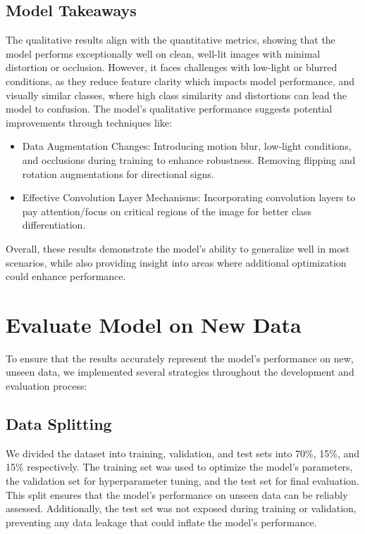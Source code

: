 \documentclass{article} %
\begin{document}
\subsection{Model Takeaways}

The qualitative results align with the quantitative metrics, showing that the model performs exceptionally well on clean, well-lit images with minimal distortion or occlusion. However, it faces challenges with low-light or blurred conditions, as they reduce feature clarity which impacts model performance, and visually similar classes, where high class similarity and distortions can lead the model to confusion. The model’s qualitative performance suggests potential improvements through techniques like:
\begin{itemize}
    \item Data Augmentation Changes: Introducing motion blur, low-light conditions, and occlusions during training to enhance robustness. Removing flipping and rotation augmentations for directional signs.
    \item Effective Convolution Layer Mechanisms: Incorporating convolution layers to pay attention/focus on critical regions of the image for better class differentiation.
\end{itemize}
Overall, these results demonstrate the model's ability to generalize well in most scenarios, while also providing insight into areas where additional optimization could enhance performance.


\section{Evaluate Model on New Data}

To ensure that the results accurately represent the model's performance on new, unseen data, we implemented several strategies throughout the development and evaluation process:

\subsection{Data Splitting}

We divided the dataset into training, validation, and test sets into 70\%, 15\%, and 15\% respectively. The training set was used to optimize the model's parameters, the validation set for hyperparameter tuning, and the test set for final evaluation. This split ensures that the model's performance on unseen data can be reliably assessed. Additionally, the test set was not exposed during training or validation, preventing any data leakage that could inflate the model's performance.
\end{document}
